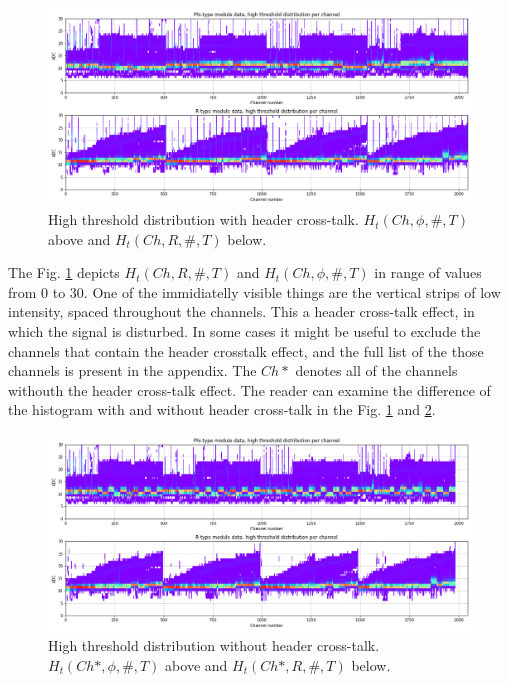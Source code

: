 \begin{figure}
    \centering
    \includegraphics[width=0.7\linewidth]{figures/chapter4/calib_analysis/P2-threshold-all-zoom.png}
    \caption{High threshold distribution with header cross-talk. $H_t(Ch, \phi, \#, T)$ above and $H_t(Ch, R, \#, T)$ below.}
    \label{plot:P2-threshold-all-zoom}
\end{figure}

The Fig. \ref{plot:P2-threshold-all-zoom} depicts $H_t(Ch, R, \#, T)$ and $H_t(Ch, \phi, \#, T)$ in range of values from 0 to 30. One of the immidiatelly visible things are the vertical strips of low intensity, spaced throughout the channels. This a header cross-talk effect, in which the signal is disturbed.
In some cases it might be useful to exclude the channels that contain the header crosstalk effect, and the full list of the those channels is present in the appendix.
The $Ch*$ denotes all of the channels withouth the header cross-talk effect. 
The reader can examine the difference of the histogram with and without header cross-talk in the Fig. \ref{plot:P2-threshold-all-zoom} and \ref{plot:P2-threshold-all-zoom-nohc}.

\begin{figure}
    \centering
    \includegraphics[width=0.7\linewidth]{figures/chapter4/calib_analysis/P2-threshold-all-zoom-nohc.png}
    \caption{High threshold distribution without header cross-talk. $H_t(Ch*, \phi, \#, T)$ above and $H_t(Ch*, R, \#, T)$ below.}
    \label{plot:P2-threshold-all-zoom-nohc}
\end{figure}


